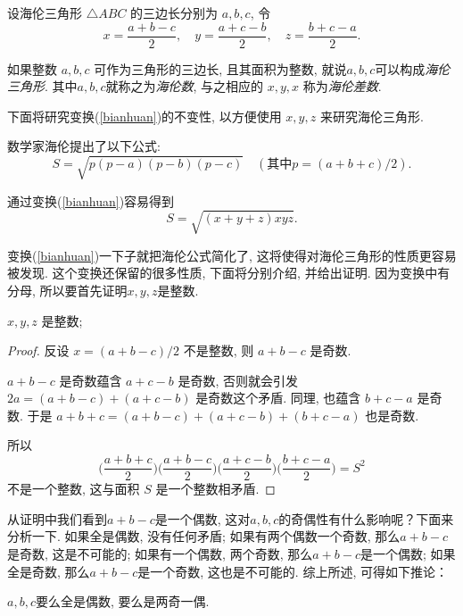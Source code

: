 \documentclass[12pt]{article}
\begin{document}
设海伦三角形 $\triangle ABC$ 的三边长分别为 $a,b,c$, 令
    \begin{equation}\label{bianhuan}
         x=\frac{a+b-c}{2},\quad y=\frac{a+c-b}{2}, \quad z=\frac{b+c-a}{2}.
    \end{equation}

\begin{definition}
    如果整数 $a,b,c$ 可作为三角形的三边长, 且其面积为整数, 就说$a,b,c$可以构成\emph{海伦三角形}. 其中$a,b,c$就称之为\emph{海伦数}, 与之相应的 $x,y,x$ 称为\emph{海伦差数}. 
\end{definition}

下面将研究变换(\ref{bianhuan})的不变性, 以方便使用 $x,y,z$ 来研究海伦三角形. 

数学家海伦提出了以下公式: 
   \[S=\sqrt{p(p-a)(p-b)(p-c)}\quad (\text{其中} p=(a+b+c)/2). \]       

通过变换(\ref{bianhuan})容易得到
\begin{equation} \label{gongshi}
    S=\sqrt{(x+y+z)xyz}.        
\end{equation}

变换(\ref{bianhuan})一下子就把海伦公式简化了, 这将使得对海伦三角形的性质更容易被发现. 这个变换还保留的很多性质, 下面将分别介绍, 并给出证明. 因为变换中有分母, 所以要首先证明$x,y,z$是整数. 

\begin{theorem}\label{zhengshu}
    $x,y,z$ 是整数; 
\end{theorem}
\begin{proof}
    反设 $x=(a+b-c)/2$ 不是整数, 则 $a+b-c$ 是奇数. \par
    $a+b-c$ 是奇数蕴含 $a+c-b$ 是奇数, 否则就会引发 $2a=(a+b-c)+(a+c-b)$ 是奇数这个矛盾. 同理, 也蕴含 $b+c-a$ 是奇数. 于是 $a+b+c=(a+b-c)+(a+c-b)+(b+c-a)$ 也是奇数. \par
    所以\[\bigg(\frac{a+b+c}{2}\bigg) \bigg(\frac{a+b-c}{2}\bigg) \bigg(\frac{a+c-b}{2}\bigg) \bigg(\frac{b+c-a}{2}\bigg) = S^2\]
    不是一个整数, 这与面积 $S$ 是一个整数相矛盾. 
\end{proof}

从证明中我们看到$a+b-c$是一个偶数, 这对$a,b,c$的奇偶性有什么影响呢？下面来分析一下. 如果全是偶数, 没有任何矛盾; 如果有两个偶数一个奇数, 那么$a+b-c$是奇数, 这是不可能的; 如果有一个偶数, 两个奇数, 那么$a+b-c$是一个偶数; 如果全是奇数, 那么$a+b-c$是一个奇数, 这也是不可能的. 综上所述, 可得如下推论：

\begin{corollary}
$a,b,c$要么全是偶数, 要么是两奇一偶. 
\end{corollary}
\end{document}
